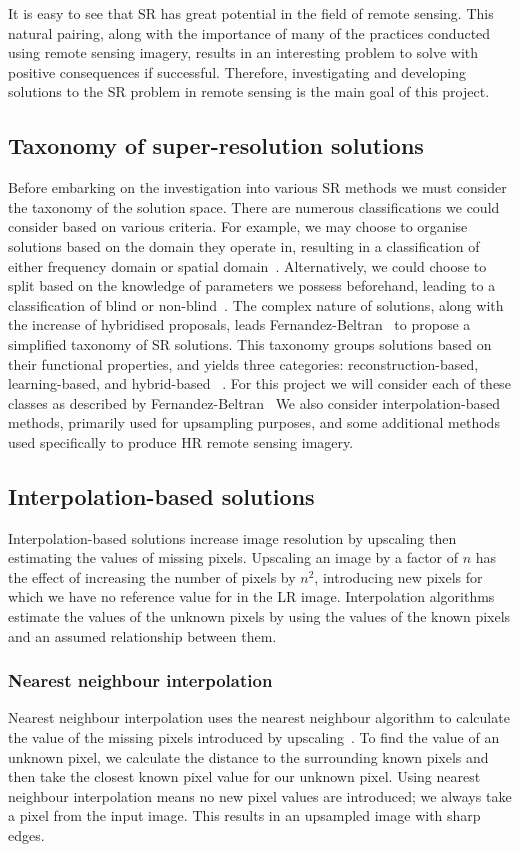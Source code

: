 It is easy to see that SR has great potential in the field of remote sensing. This natural pairing, along with the importance of many of the practices conducted using remote sensing imagery, results in an interesting problem to solve with positive consequences if successful. Therefore, investigating and developing solutions to the SR problem in remote sensing is the main goal of this project.

\subsection{Taxonomy of super-resolution solutions}
Before embarking on the investigation into various SR methods we must consider the taxonomy of the solution space. There are numerous classifications we could consider based on various criteria. For example, we may choose to organise solutions based on the domain they operate in, resulting in a classification of either frequency domain or spatial domain~\cite{superResRemoteSensingOverview}. Alternatively, we could choose to split based on the knowledge of parameters we possess beforehand, leading to a classification of blind or non-blind~\cite{superResRemoteSensingOverview}. The complex nature of solutions, along with the increase of hybridised proposals, leads Fernandez-Beltran \etal\ to propose a simplified taxonomy of SR solutions. This taxonomy groups solutions based on their functional properties, and yields three categories: reconstruction-based, learning-based, and hybrid-based ~\cite{superResRemoteSensingOverview}. For this project we will consider each of these classes as described by Fernandez-Beltran \etal\ We also consider interpolation-based methods, primarily used for upsampling purposes, and some additional methods used specifically to produce HR remote sensing imagery.

\subsection{Interpolation-based solutions}
Interpolation-based solutions increase image resolution by upscaling then estimating the values of missing pixels. Upscaling an image by a factor of $n$ has the effect of increasing the number of pixels by $n^2$, introducing new pixels for which we have no reference value for in the LR image. Interpolation algorithms estimate the values of the unknown pixels by using the values of the known pixels and an assumed relationship between them. 

\subsubsection{Nearest neighbour interpolation}
Nearest neighbour interpolation uses the nearest neighbour algorithm to calculate the value of the missing pixels introduced by upscaling~\cite{nnInterpolation}. To find the value of an unknown pixel, we calculate the distance to the surrounding known pixels and then take the closest known pixel value for our unknown pixel. Using nearest neighbour interpolation means no new pixel values are introduced; we always take a pixel from the input image. This results in an upsampled image with sharp edges.


